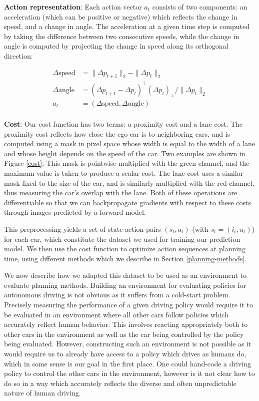 \documentclass{article} %
\begin{document}
\textbf{Action representation}: Each action vector $a_t$ consists of two components: an acceleration (which can be positive or negative) which reflects the change in speed, and a change in angle.
The acceleration at a given time step is computed by taking the difference between two consecutive speeds, while the change in angle is computed by projecting the change in speed along its orthogonal direction:

\begin{align*}
  \Delta \mbox{speed} &= \| \Delta p_{t+1} \|_2 - \| \Delta p_t \|_2 \\
  \Delta \mbox{angle} &= (\Delta p_{t+1} - \Delta p_t)^\top (\Delta p_t)_\perp / \| \Delta p_t \|_2  \\
  a_t &= (\Delta \mbox{speed}, \Delta \mbox{angle}) \\
\end{align*}




\textbf{Cost}: Our cost function has two terms: a proximity cost and a lane cost. The proximity cost reflects how close the ego car is to neighboring cars, and is computed using a mask in pixel space whose width is equal to the width of a lane and whose height depends on the speed of the car. Two examples are shown in Figure \ref{cost}.
This mask is pointwise multiplied with the green channel, and the maximum value is taken to produce a scalar cost.
The lane cost uses a similar mask fixed to the size of the car, and is similarly multiplied with the red channel, thus measuring the car's overlap with the lane.
Both of these operations are differentiable so that we can backpropagate gradients with respect to these costs through images predicted by a forward model.

This preprocessing yields a set of state-action pairs $(s_t, a_t)$ (with $s_t=(i_t, u_t)$) for each car, which constitute the dataset we used for training our prediction model.
We then use the cost function to optimize action sequences at planning time, using different methods which we describe in Section \ref{planning-methods}.

We now describe how we adapted this dataset to be used as an environment to evaluate planning methods.
Building an environment for evaluating policies for autonomous driving is not obvious as it suffers from a cold-start problem.
Precisely measuring the performance of a given driving policy would require it to be evaluated in an environment where all other cars follow policies which accurately reflect human behavior.
This involves reacting appropriately both to other cars in the environment as well as the car being controlled by the policy being evaluated.
However, constructing such an environment is not possible as it would require us to already have access to a policy which drives as humans do, which in some sense is our goal in the first place. One could hand-code a driving policy to control the other cars in the environment, however is it not clear how to do so in a way which accurately reflects the diverse and often unpredictable nature of human driving.
\end{document}
